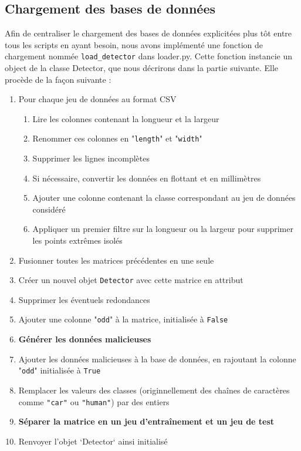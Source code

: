 \documentclass[a4paper]{report}
\begin{document}
\subsection{Chargement des bases de données}

Afin de centraliser le chargement des bases de données explicitées plus tôt entre tous les scripts en ayant besoin, nous avons implémenté une fonction de chargement nommée \texttt{load\_detector} dans loader.py. Cette fonction instancie un object de la classe Detector, que nous décrirons dans la partie suivante. Elle procède de la façon suivante :

\begin{enumerate}
\item Pour chaque jeu de données au format CSV
\begin{enumerate}[{1.}1.]
\item Lire les colonnes contenant la longueur et la largeur
\item Renommer ces colonnes en "\texttt{length}" et "\texttt{width}"
\item Supprimer les lignes incomplètes
\item Si nécessaire, convertir les données en flottant et en millimètres
\item Ajouter une colonne contenant la classe correspondant au jeu de données considéré
\item Appliquer un premier filtre sur la longueur ou la largeur pour supprimer les points extrêmes isolés
\end{enumerate}
\item Fusionner toutes les matrices précédentes en une seule
\item Créer un nouvel objet \texttt{Detector} avec cette matrice en attribut
\item Supprimer les éventuels redondances
\item Ajouter une colonne "\texttt{odd}" à la matrice, initialisée à \texttt{False}
\item \textbf{Générer les données malicieuses}
\item Ajouter les données malicieuses à la base de données, en rajoutant la colonne "\texttt{odd}" initialisée à \texttt{True}
\item Remplacer les valeurs des classes (originnellement des chaînes de caractères comme \texttt{"car"} ou \texttt{"human"}) par des entiers
\item \textbf{Séparer la matrice en un jeu d'entraînement et un jeu de test}
\item Renvoyer l'objet `Detector` ainsi initialisé
\end{enumerate}
\end{document}
